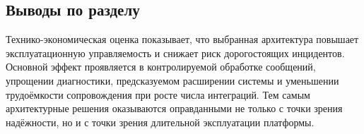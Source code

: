 \subsection{Выводы по разделу}

Технико-экономическая оценка показывает, что выбранная архитектура повышает эксплуатационную
управляемость и снижает риск дорогостоящих инцидентов. Основной эффект проявляется в
контролируемой обработке сообщений, упрощении диагностики, предсказуемом расширении системы
и уменьшении трудоёмкости сопровождения при росте числа интеграций.
Тем самым архитектурные решения оказываются оправданными не только с точки зрения надёжности,
но и с точки зрения длительной эксплуатации платформы.
